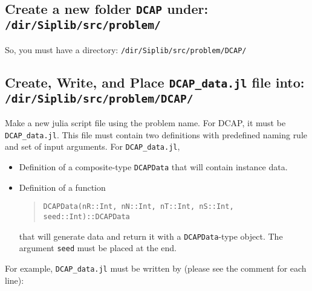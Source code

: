 \documentclass[11pt]{article}
\newcommand{\dcap}{\textsf{DCAP}}
\begin{document}
\subsection{Create a new folder \texttt{DCAP} under: \texttt{/dir/Siplib/src/problem/}}
So, you must have a directory: \texttt{/dir/Siplib/src/problem/DCAP/}
\subsection{Create, Write, and Place \texttt{DCAP\_data.jl} file into: \texttt{/dir/Siplib/src/problem/DCAP/}}
Make a new julia script file using the problem name. For \dcap, it must be \texttt{DCAP\_data.jl}. This file must contain two definitions with predefined naming rule and set of input arguments. For \texttt{DCAP\_data.jl},
\begin{itemize}
	\item Definition of a composite-type \texttt{DCAPData} that will contain instance data.
	\item Definition of a function
	\begin{quote}\centering\noindent\texttt{DCAPData(nR::Int, nN::Int, nT::Int, nS::Int, seed::Int)::DCAPData}\end{quote}
	that will generate data and return it with a \texttt{DCAPData}-type object. The argument \texttt{seed} must be placed at the end.
\end{itemize}
For example, \texttt{DCAP\_data.jl} must be written by (please see the comment for each line):
\end{document}
